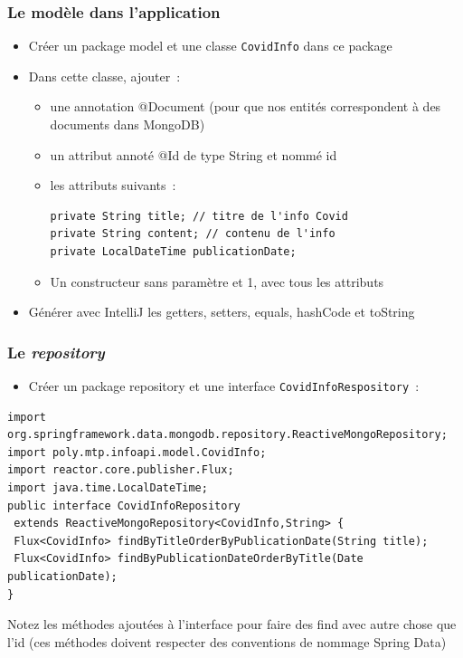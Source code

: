 \documentclass{beamer}
\begin{document}
\begin{frame}[fragile]
	\frametitle{Le modèle dans l'application}
	\begin{itemize}
		\item Créer un package model et une classe \texttt{CovidInfo} dans ce package
		\item Dans cette classe, ajouter~:
		\begin{itemize}
			\item une annotation @Document (pour que nos entités correspondent à des documents dans MongoDB)
			\item un attribut annoté @Id de type String et nommé id
			\item les attributs suivants~:
\begin{lstlisting}
private String title; // titre de l'info Covid
private String content; // contenu de l'info
private LocalDateTime publicationDate;
\end{lstlisting}
\item Un constructeur sans paramètre et 1, avec tous les attributs
		\end{itemize}
	\item Générer avec IntelliJ les getters, setters, equals, hashCode et toString
	\end{itemize}
\end{frame}

\begin{frame}[fragile]
	\frametitle{Le \textit{repository}}
	\begin{itemize}
		\item Créer un package repository et une interface \texttt{CovidInfoRespository}~:
	\end{itemize}
\begin{lstlisting}
import org.springframework.data.mongodb.repository.ReactiveMongoRepository;
import poly.mtp.infoapi.model.CovidInfo;
import reactor.core.publisher.Flux;
import java.time.LocalDateTime;
public interface CovidInfoRepository
 extends ReactiveMongoRepository<CovidInfo,String> {
 Flux<CovidInfo> findByTitleOrderByPublicationDate(String title);
 Flux<CovidInfo> findByPublicationDateOrderByTitle(Date publicationDate);
}
\end{lstlisting}
Notez les méthodes ajoutées à l'interface pour faire des find avec autre chose que l'id (ces méthodes doivent respecter des conventions de nommage Spring Data)
\end{frame}
\end{document}
